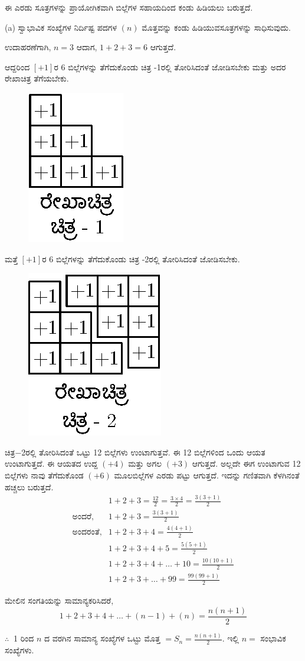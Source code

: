 ಈ ಎರಡು ಸೂತ್ರಗಳನ್ನು ಪ್ರಾಯೋಗಿಕವಾಗಿ ಬಿಲ್ಲೆಗಳ ಸಹಾಯದಿಂದ ಕಂಡು ಹಿಡಿ\break ಯಲು ಬರುತ್ತದೆ. 

(a) ಸ್ವಾಭಾವಿಕ ಸಂಖ್ಯೆಗಳ ನಿರ್ದಿಷ್ಟ ಪದಗಳ $(n)$ ಮೊತ್ತವನ್ನು ಕಂಡು ಹಿಡಿಯುವ\break ಸೂತ್ರಗಳನ್ನು ಸಾಧಿಸುವುದು. 

ಉದಾಹರಣೆಗಾಗಿ, $n = 3$ ಆದಾಗ, $1 + 2 + 3 = 6$ ಆಗುತ್ತದೆ. 

ಆದ್ದರಿಂದ $[+1]$ರ 6 ಬಿಲ್ಲೆಗಳನ್ನು ತೆಗೆದುಕೊಂಡು ಚಿತ್ರ -1ರಲ್ಲಿ ತೋರಿಸಿದಂತೆ ಜೋಡಿಸ\-ಬೇಕು ಮತ್ತು ಅದರ ರೇಖಾಚಿತ್ರ ತೆಗೆಯಬೇಕು.
\begin{figure}[H]
\centering
\includegraphics{src/figure/chap3/fig3-57a.eps}
\end{figure}

ಮತ್ತೆ $[+1]$ರ 6 ಬಿಲ್ಲೆಗಳನ್ನು ತೆಗೆದುಕೊಂಡು ಚಿತ್ರ -2ರಲ್ಲಿ ತೋರಿಸಿದಂತೆ ಜೋಡಿಸ\-ಬೇಕು.
\begin{figure}[H]
\centering
\includegraphics{src/figure/chap3/fig3-57b.eps}
\end{figure}

ಚಿತ್ರ$-$2ರಲ್ಲಿ ತೋರಿಸಿದಂತೆ ಒಟ್ಟು 12 ಬಿಲ್ಲೆಗಳು ಉಂಟಾಗುತ್ತವೆ. ಈ 12 ಬಿಲ್ಲೆ\break ಗಳಿಂದ \hbox{ಒಂದು} ಆಯತ ಉಂಟಾಗುತ್ತದೆ. ಈ ಆಯತದ ಉದ್ದ $(+4)$ ಮತ್ತು ಅಗಲ $(+3)$ ಆಗುತ್ತದೆ. ಅಲ್ಲದೇ ಈಗ ಉಂಟಾಗುವ 12 ಬಿಲ್ಲೆಗಳು ನಾವು ತೆಗೆದುಕೊಂಡ $(+6)$ ಮೂಲಬಿಲ್ಲೆಗಳ ಎರಡು ಪಟ್ಟು ಆಗುತ್ತದೆ. ಇದನ್ನು ಗಣಿತವಾಗಿ ಕೆಳಗಿನಂತೆ ಹಚ್ಚಲು ಬರುತ್ತದೆ. 
\begin{align*}
& 1 + 2 + 3 = \frac{12}{2} = \frac{3 \times 4}{2} = \frac{3(3+1)}{2}\\
\text{ಅಂದರೆ}, & 1 + 2 + 3 = \frac{3(3+1)}{2}\\
\text{ಅಂದರಂತೆ}, & 1 + 2 + 3 + 4 = \frac{4(4+1)}{2}\\
& 1 + 2 + 3 + 4 + 5 = \frac{5(5+1)}{2}\\
& 1 + 2 + 3 + 4 + \hdots + 10 = \frac{10(10+1)}{2}\\
& 1 + 2 + 3 + \hdots + 99 = \frac{99(99+1)}{2}
\end{align*}

ಮೇಲಿನ ಸಂಗತಿಯನ್ನು ಸಾಮಾನ್ಯಕರಿಸಿದರೆ,
$$
1 + 2 + 3 + 4 + \hdots + (n-1) + (n) = \frac{n(n+1)}{2}
$$

$\therefore~$ 1 ರಿಂದ $n$ ದ ವರಗಿನ ಸಾಮಾನ್ಯ ಸಂಖ್ಯೆಗಳ ಒಟ್ಟು ಮೊತ್ತ $= S_{n} = \frac{n(n+1)}{2}$. ಇಲ್ಲಿ $n =$ ಸಂಭಾವಿಕ ಸಂಖ್ಯೆಗಳು. 
